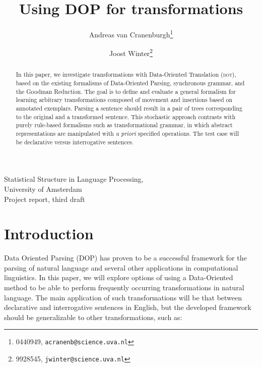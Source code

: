 \documentclass[a4paper]{article}
\theoremstyle{definition}
\begin{document}
\title{Using DOP for transformations}
\author{Andreas van Cranenburgh\footnote{0440949, \texttt{acranenb@science.uva.nl}} 
\and Joost Winter\footnote{9928545, \texttt{jwinter@science.uva.nl}}}
\maketitle

\begin{center}
Statistical Structure in Language Processing, \\
University of Amsterdam \\
Project report, third draft
\end{center}

\vspace{5em}

\begin{abstract}
In this paper, we investigate transformations with Data-Oriented Translation (\textsc{dot}),
based on the existing formalisms of Data-Oriented Parsing, synchronous
grammar, and the Goodman Reduction. The goal is to define and evaluate a general
formalism for learning arbitrary transformations composed of movement and insertions
based on annotated exemplars.  Parsing a sentence should result in a pair of trees
corresponding to the original and a transformed sentence. 
This stochastic approach contrasts with purely rule-based formalisms such as
transformational grammar, in which abstract representations are manipulated
with {\em a priori} specified operations. %
The test case will be declarative versus interrogative sentences.
\end{abstract}

\newpage
\tableofcontents

\section{Introduction}

Data Oriented Parsing (DOP) has proven to be a successful framework for the
parsing of natural language and several other applications in computational
linguistics. In this paper, we will explore options of using a Data-Oriented method
to be able to perform frequently occurring transformations in natural language.
The main application of such transformations will be that between declarative
and interrogative sentences in English, but the developed framework should be
generalizable to other transformations, such as:
\end{document}
